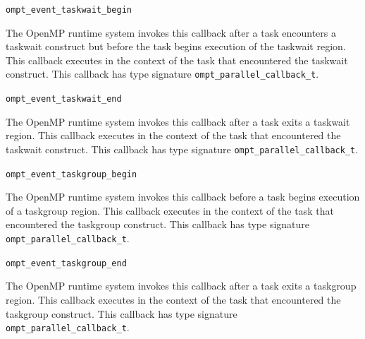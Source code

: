 \documentclass{article}
\newcommand{\descheader}[1]{{\needspace{3\baselineskip}\vspace{1em}\noindent \fbox{#1}}}
\begin{document}
\begin{description}
 
\item \verb|ompt_event_taskwait_begin|

\sloppy
  The OpenMP runtime system invokes this callback after a task encounters a taskwait construct but
before the task
  begins execution of the taskwait region. This callback executes in
  the context of the task that encountered the taskwait construct.
  This callback has type signature \verb|ompt_parallel_callback_t|. 
 
\item \verb|ompt_event_taskwait_end|

  The OpenMP runtime system invokes this callback after a task
  exits a taskwait region.  This callback
  executes in the context of the task that encountered the taskwait construct.
  This callback has type signature \verb|ompt_parallel_callback_t|. 

\end{description}

\descheader{Taskgroup}

\begin{description}
 
\item \verb|ompt_event_taskgroup_begin|

  The OpenMP runtime system invokes this callback before a task begins execution of a taskgroup region. This callback executes
  in the context of the task that encountered the taskgroup construct.
  This callback has type signature \verb|ompt_parallel_callback_t|. 
 
\item \verb|ompt_event_taskgroup_end|

  The OpenMP runtime system invokes this callback after a task exits a taskgroup region.  This callback
  executes in the context of the task that encountered the taskgroup construct.
  This callback has type signature \verb|ompt_parallel_callback_t|. 

\end{description}

\descheader{Locks}
\end{document}
